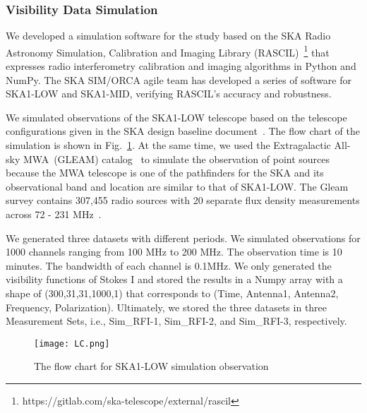 \documentclass[usenatbib]{mnras}
\begin{document}


\subsubsection{Visibility Data Simulation}
\label{norfi}
We developed a simulation software for the study based on the SKA Radio Astronomy Simulation, Calibration and Imaging Library (RASCIL)~\footnote{https://gitlab.com/ska-telescope/external/rascil} that expresses radio interferometry calibration and imaging algorithms in Python and NumPy. The SKA SIM/ORCA agile team has developed a series of software for SKA1-LOW and SKA1-MID, verifying RASCIL’s accuracy and robustness.

We simulated observations of the SKA1-LOW telescope based on the telescope configurations given in the SKA design baseline document~\citep{dewdney2019ska1}. The flow chart of the simulation is shown in Fig.~\ref{fig:flow}. At the same time, we used the Extragalactic All-sky MWA~(GLEAM) catalog~\citep{wayth2015gleam}  to simulate the observation of point sources because the MWA telescope is one of the pathfinders for the SKA and its observational band and location are similar to that of SKA1-LOW. The Gleam survey contains 307,455 radio sources with 20 separate flux density measurements across 72 - 231 MHz~\citep{wayth2015gleam}. 

We generated three datasets with different periods. We simulated observations for 1000 channels ranging from 100 MHz to 200 MHz. The observation time is 10 minutes. The bandwidth of each channel is 0.1MHz. We only generated the visibility functions of Stokes I and stored the results in a Numpy array with a shape of (300,31,31,1000,1) that corresponds to (Time, Antenna1, Antenna2, Frequency, Polarization). 
Ultimately, we stored the three datasets in three Measurement Sets, i.e., Sim\_RFI-1, Sim\_RFI-2, and Sim\_RFI-3, respectively.  


\begin{figure}
    \centering
	\texttt{[image: LC.png]}
    \caption{The flow chart for SKA1-LOW simulation observation}
    \label{fig:flow}
\end{figure}
\end{document}
